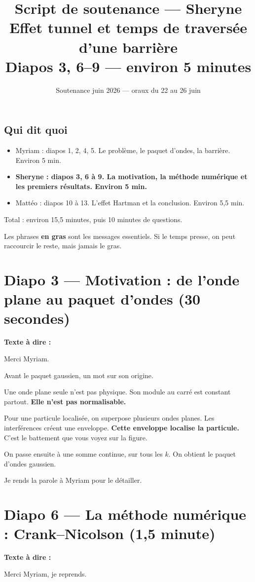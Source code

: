 \documentclass[12pt,a4paper]{article}
\title{\textbf{Script de soutenance --- Sheryne}\\
	\large Effet tunnel et temps de traversée d'une barrière\\
	\normalsize Diapos 3, 6--9 --- environ 5 minutes}
\author{}
\date{Soutenance juin 2026 --- oraux du 22 au 26 juin}
\newcommand{\diapo}[2]{\section*{Diapo #1 --- #2}}
\begin{document}
	\maketitle
	
	\subsection*{Qui dit quoi}
	
	\begin{itemize}
		\item Myriam : diapos 1, 2, 4, 5. Le problème, le paquet d'ondes, la barrière. Environ 5 min.
		\item \textbf{Sheryne : diapos 3, 6 à 9. La motivation, la méthode numérique et les premiers résultats. Environ 5 min.}
		\item Mattéo : diapos 10 à 13. L'effet Hartman et la conclusion. Environ 5,5 min.
	\end{itemize}
	
	Total : environ 15,5 minutes, puis 10 minutes de questions.
	
	Les phrases \textbf{en gras} sont les messages essentiels.
	Si le temps presse, on peut raccourcir le reste, mais jamais le gras.
	
	\clearpage
	\diapo{3}{Motivation : de l'onde plane au paquet d'ondes (30 secondes)}
	
	\textbf{Texte à dire :}
	
	Merci Myriam.
	
	Avant le paquet gaussien, un mot sur son origine.
	
	Une onde plane seule n'est pas physique.
	Son module au carré est constant partout.
	\textbf{Elle n'est pas normalisable.}
	
	Pour une particule localisée, on superpose plusieurs ondes planes.
	Les interférences créent une enveloppe.
	\textbf{Cette enveloppe localise la particule.}
	C'est le battement que vous voyez sur la figure.
	
	On passe ensuite à une somme continue, sur tous les $k$.
	On obtient le paquet d'ondes gaussien.
	
	Je rends la parole à Myriam pour le détailler.
	
	\clearpage
	\diapo{6}{La méthode numérique : Crank--Nicolson (1,5 minute)}
	
	\textbf{Texte à dire :}
	
	Merci Myriam, je reprends.
	
\end{document}
